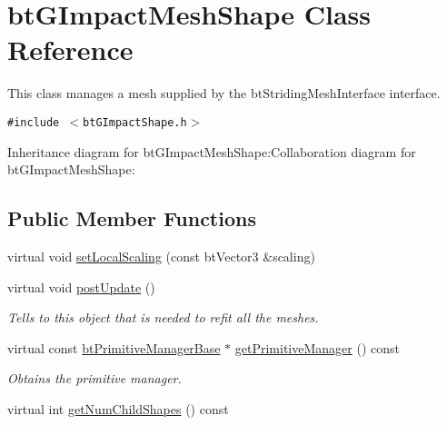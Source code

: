 \hypertarget{classbt_g_impact_mesh_shape}{
\section{btGImpactMeshShape Class Reference}
\label{classbt_g_impact_mesh_shape}
}
This class manages a mesh supplied by the btStridingMeshInterface interface.  


{\tt \#include $<$btGImpactShape.h$>$}

Inheritance diagram for btGImpactMeshShape:Collaboration diagram for btGImpactMeshShape:\subsection*{Public Member Functions}
\begin{CompactItemize}
\item 
virtual void \hyperlink{classbt_g_impact_mesh_shape_ed8d5e4b2e75538109909d44b244bc35}{setLocalScaling} (const btVector3 \&scaling)
\item 
\hypertarget{classbt_g_impact_mesh_shape_fbf7ae3408bc0ab975c46ed65820a4b2}{
virtual void \hyperlink{classbt_g_impact_mesh_shape_fbf7ae3408bc0ab975c46ed65820a4b2}{postUpdate} ()}
\label{classbt_g_impact_mesh_shape_fbf7ae3408bc0ab975c46ed65820a4b2}

\begin{CompactList}\small\item\em Tells to this object that is needed to refit all the meshes. \item\end{CompactList}\item 
\hypertarget{classbt_g_impact_mesh_shape_af65a0a643eab8dce1b2f0a89880bcd7}{
virtual const \hyperlink{classbt_primitive_manager_base}{btPrimitiveManagerBase} $\ast$ \hyperlink{classbt_g_impact_mesh_shape_af65a0a643eab8dce1b2f0a89880bcd7}{getPrimitiveManager} () const }
\label{classbt_g_impact_mesh_shape_af65a0a643eab8dce1b2f0a89880bcd7}

\begin{CompactList}\small\item\em Obtains the primitive manager. \item\end{CompactList}\item 
\hypertarget{classbt_g_impact_mesh_shape_ec0f4ed6bed09ef67349eed0a05921c1}{
virtual int \hyperlink{classbt_g_impact_mesh_shape_ec0f4ed6bed09ef67349eed0a05921c1}{getNumChildShapes} () const }
\label{classbt_g_impact_mesh_shape_ec0f4ed6bed09ef67349eed0a05921c1}


\end{CompactItemize}
